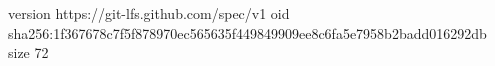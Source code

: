 version https://git-lfs.github.com/spec/v1
oid sha256:1f367678c7f5f878970ec565635f449849909ee8c6fa5e7958b2badd016292db
size 72

